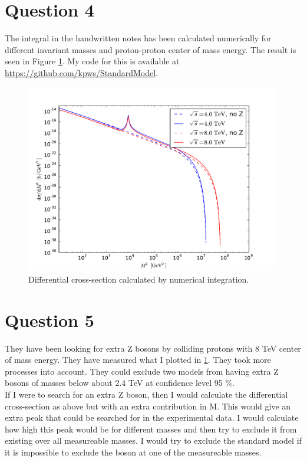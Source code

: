 \documentclass[a4paper,10pt]{article}
\begin{document}
\section{Question 4}
The integral in the handwritten notes has been calculated numerically for different invariant masses and proton-proton center of mass energy. The result is seen in Figure \ref{cc}. My code for this is available at \url{https://github.com/kpws/StandardModel}.
\begin{figure}
\centering
\includegraphics[width=11cm]{../cc.pdf}
\caption{Differential cross-section calculated by numerical integration.}
\label{cc}
\end{figure}
\section{Question 5}
They have been looking for extra Z bosons by colliding protons with 8 TeV center of mass energy. They have measured what I plotted in \ref{cc}. They took more processes into account. They could exclude two models from having extra Z bosons of masses below about 2.4 TeV at confidence level 95 \%.\\
If I were to search for an extra Z boson, then I would calculate the differential cross-section as above but with an extra contribution in M. This would give an extra peak that could be searched for in the experimental data. I would calculate how high this peak would be for different masses and then try to exclude it from existing over all measureable masses. I would try to exclude the standard model if it is impossible to exclude the boson at one of the measureable masses.
\end{document}
